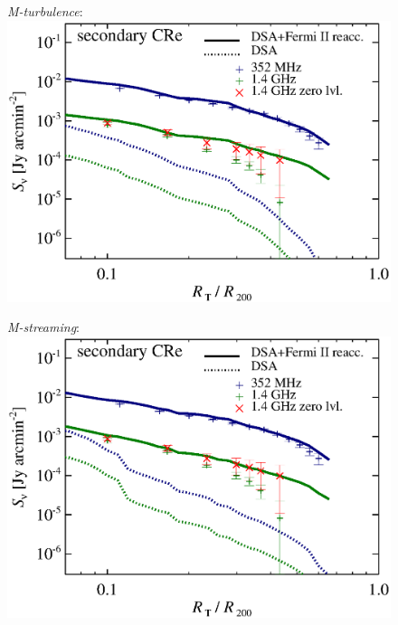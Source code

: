 \documentclass[useAMS,usenatbib]{mn2e}
\newcommand{\Mstream}{{\it M-streaming}\xspace}
\newcommand{\Mflatturb}{{\it M-turbulence}\xspace}
\begin{document}
\begin{figure}
\begin{minipage}{1\columnwidth}
  \begin{center}\LARGE{\Mflatturb:}\\ 
    \includegraphics[width=\columnwidth]{figures/sbright.nu.DIIcomp.I0.g72a.Rad14.2400p.z0.NL.xKR.eb23.eI066.140.v5.halo.test5.eps}
  \end{center}
\end{minipage}
\begin{minipage}{1\columnwidth}
   \begin{center}\LARGE{\Mstream:}\\
     \includegraphics[width=\columnwidth]{figures/sbright.nu.DIIcomp.flatCR.g72a.Rad14.2400p.z0.NL.xKR.eb23.eI081.flatCR.140.v5.halo.test5.eps}

\end{center}
\end{minipage}
\end{figure}
\end{document}
